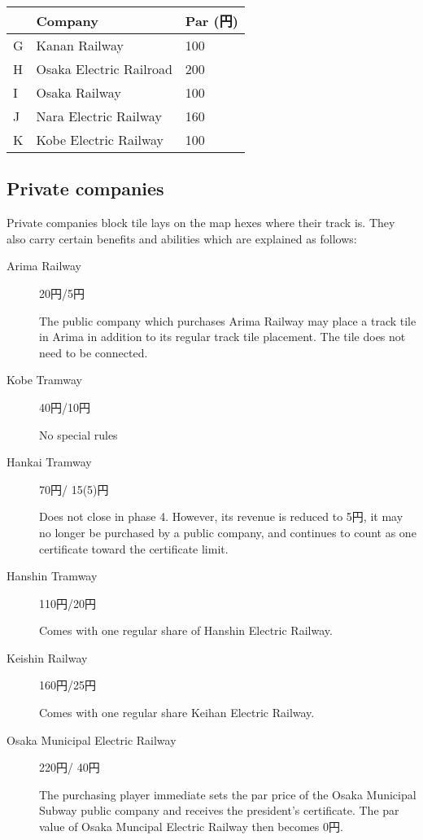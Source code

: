 \documentclass{article}
\begin{document}
\begin{CJK}{UTF8}{min}
\begin{multicols}{2}
\begin{description}
\begin{tabular}{lll}
 & Company & Par (円) \\
\hline
G & Kanan Railway & 100\\
H & Osaka Electric Railroad & 200\\
I & Osaka Railway & 100 \\
J & Nara Electric Railway & 160\\
K & Kobe Electric Railway & 100
\end{tabular}
\end{description}

\subsection{Private companies}\label{privates}
Private companies block tile lays on the map hexes where their track
is. They also carry certain benefits and abilities which are explained
as follows:

\begin{description}
\item[Arima Railway] \hfill 20円/5円

  The public company which purchases Arima Railway may place a track
  tile in Arima in addition to its regular track tile placement. The
  tile does not need to be connected.

\item[Kobe Tramway] \hfill 40円/10円

  No special rules

\item[Hankai Tramway] \hfill 70円/ 15(5)円

  Does not close in phase 4. However, its revenue is reduced to 5円, it may
  no longer be purchased by a public company, and continues to count
  as one certificate toward the certificate limit.

\item[Hanshin Tramway] \hfill 110円/20円

Comes with one regular share of Hanshin Electric Railway.

\item[Keishin Railway] \hfill 160円/25円

Comes with one regular share Keihan Electric Railway.

\item[Osaka Municipal Electric Railway] \hfill 220円/ 40円 \label{osaka-municipal}

  The purchasing player immediate sets the par price of the Osaka
  Municipal Subway public company and receives the president's
  certificate. The par value of Osaka Muncipal Electric Railway then
  becomes 0円.


\end{description}
\end{multicols}
\end{CJK}
\end{document}
